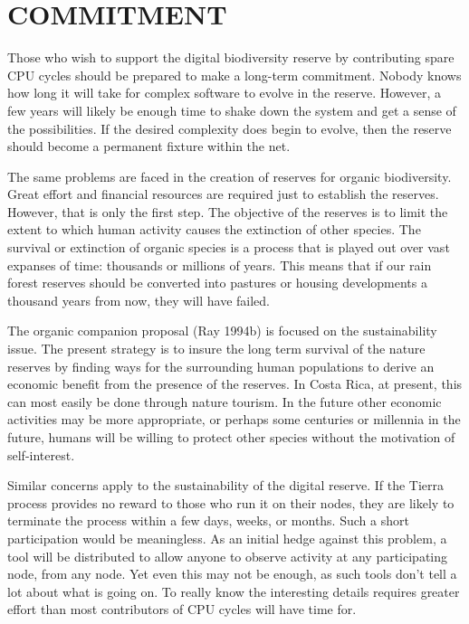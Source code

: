 \section{\bf COMMITMENT}

Those who wish to support the digital biodiversity reserve by contributing
spare CPU cycles should be prepared to make a long-term commitment.
Nobody knows how long it will take for complex software to evolve in the
reserve.  However, a few years will likely be enough time to shake down
the system and get a sense of the possibilities.  If the desired complexity
does begin to evolve, then the reserve should become a permanent fixture
within the net.

The same problems are faced in the creation of reserves for organic
biodiversity.  Great effort and financial resources are required just
to establish the reserves.  However, that is only the first step.
The objective of the reserves is to limit the extent to which human
activity causes the extinction of other species.  The survival or
extinction of organic species is a process that is played out over vast
expanses of time: thousands or millions of years.  This means that if
our rain forest reserves should be converted into pastures or housing
developments a thousand years from now, they will have failed.

The organic companion proposal (Ray 1994b) is focused on the sustainability
issue.  The present strategy is to insure the long term survival of the
nature reserves by finding ways for the surrounding human populations
to derive an economic benefit from the presence of the reserves.  In
Costa Rica, at present, this can most easily be done through nature tourism.
In the future other economic activities may be more appropriate, or
perhaps some centuries or millennia in the future, humans will be willing
to protect other species without the motivation of self-interest.

Similar concerns apply to the sustainability of the digital reserve.
If the Tierra process provides no reward to those who run it on their
nodes, they are likely to terminate the process within a few days, weeks,
or months.  Such a short participation would be meaningless.  As an initial
hedge against this problem, a tool will be distributed to allow anyone to
observe activity at any participating node, from any node.  Yet even
this may not be enough, as such tools don't tell a lot about what is
going on.  To really know the interesting details requires greater effort
than most contributors of CPU cycles will have time for.


